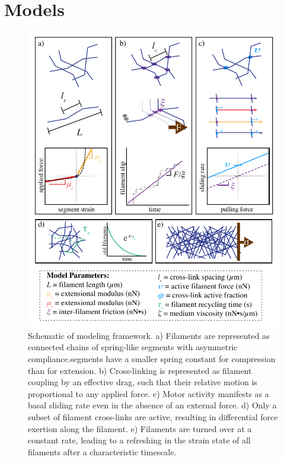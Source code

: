 \documentclass[10pt,letterpaper]{article}
\begin{document}
\section*{Models}

\begin{figure}[h!]
\centering
\includegraphics[width=\hsize]{figures/fig2/fig2}
\caption{\label{fig:sim} Schematic of modeling framework. a) Filaments are represented as connected chains of spring-like segments with asymmetric compliance.segments have a smaller spring constant for compression than for extension. b) Cross-linking is represented as filament coupling by an effective drag, such that their relative motion is proportional to any applied force. c) Motor activity manifests as a basal sliding rate even in the absence of an external force. d) Only a subset of filament cross-links are active, resulting in differential force exertion along the filament.  e)  Filaments are turned over at a constant rate, leading to a refreshing in the strain state of all filaments after a characteristic timescale.}
\end{figure}
\end{document}
